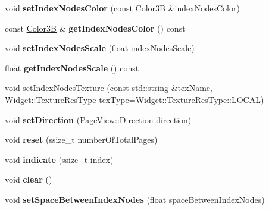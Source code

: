 \begin{DoxyCompactItemize}
void {\bfseries set\+Index\+Nodes\+Color} (const \hyperlink{structColor3B}{Color3B} \&index\+Nodes\+Color)
\item 
\mbox{\label{classui_1_1PageViewIndicator_a20657be108a6037b57f42079660fdba4}} 
const \hyperlink{structColor3B}{Color3B} \& {\bfseries get\+Index\+Nodes\+Color} () const
\item 
\mbox{\label{classui_1_1PageViewIndicator_a20bc159b9393e706dd789a5ac51890ba}} 
void {\bfseries set\+Index\+Nodes\+Scale} (float index\+Nodes\+Scale)
\item 
\mbox{\label{classui_1_1PageViewIndicator_a8e208860fc283da773ad211ea10f5f87}} 
float {\bfseries get\+Index\+Nodes\+Scale} () const
\item 
void \hyperlink{classui_1_1PageViewIndicator_a02f6ac9b071c66c829cb448416fa59e2}{set\+Index\+Nodes\+Texture} (const std\+::string \&tex\+Name, \hyperlink{classui_1_1Widget_a040a65ec5ad3b11119b7e16b98bd9af0}{Widget\+::\+Texture\+Res\+Type} tex\+Type=Widget\+::\+Texture\+Res\+Type\+::\+L\+O\+C\+AL)
\item 
\mbox{\label{classui_1_1PageViewIndicator_ad4aaec1d2afb2b76bc4d59fe417068d8}} 
void {\bfseries set\+Direction} (\hyperlink{classui_1_1ScrollView_aed2d778ae8098dcafe323b2beae8dd6b}{Page\+View\+::\+Direction} direction)
\item 
\mbox{\label{classui_1_1PageViewIndicator_abd55dcfbdadd620d02676c1de612204a}} 
void {\bfseries reset} (ssize\+\_\+t number\+Of\+Total\+Pages)
\item 
\mbox{\label{classui_1_1PageViewIndicator_af6300de4ef26a8ce599216519e2f4b69}} 
void {\bfseries indicate} (ssize\+\_\+t index)
\item 
\mbox{\label{classui_1_1PageViewIndicator_ab4f83cfb53a3d842637ff25bc21f4fd3}} 
void {\bfseries clear} ()
\item 
\mbox{\label{classui_1_1PageViewIndicator_a3342a8e395ef653cb608672263a73abc}} 
void {\bfseries set\+Space\+Between\+Index\+Nodes} (float space\+Between\+Index\+Nodes)

\end{DoxyCompactItemize}
